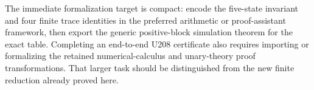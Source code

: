 The immediate formalization target is compact: encode the five-state
invariant and four finite trace identities in the preferred arithmetic
or proof-assistant framework, then export the generic positive-block
simulation theorem for the exact table. Completing an end-to-end U208
certificate also requires importing or formalizing the retained
numerical-calculus and unary-theory proof transformations. That larger
task should be distinguished from the new finite reduction already
proved here.
